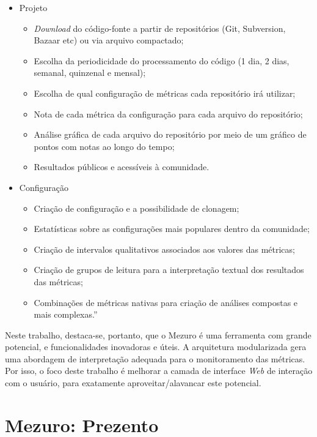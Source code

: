 \begin{itemize}
  \item Projeto
    \begin{itemize}
    \item \textit{Download} do código-fonte a partir de repositórios (Git,
    Subversion, Bazaar etc) ou via arquivo compactado;
        \item Escolha da periodicidade do processamento do código (1 dia, 2 dias,
        semanal, quinzenal e mensal);
        \item Escolha de qual configuração de métricas cada repositório irá
        utilizar;
        \item Nota de cada métrica da configuração para cada arquivo do
        repositório;
        \item Análise gráfica de cada arquivo do repositório por meio de um
        gráfico de pontos com notas ao longo do tempo;
        \item Resultados públicos e acessíveis à comunidade.
    \end{itemize}
    \item Configuração
    \begin{itemize}
    \item Criação de configuração e a possibilidade de clonagem;
        \item Estatísticas sobre as configurações mais populares dentro da
        comunidade;
        \item Criação de intervalos qualitativos associados aos valores das
        métricas;
        \item Criação de grupos de leitura para a interpretação textual dos
        resultados das métricas;
        \item Combinações de métricas nativas para criação de análises compostas
        e mais complexas.''
    \end{itemize}
\end{itemize}

Neste trabalho, destaca-se, portanto, que o Mezuro é uma ferramenta
com grande potencial, e funcionalidades inovadoras e úteis. A arquitetura
modularizada gera uma abordagem de interpretação adequada para o monitoramento
das métricas. Por isso, o foco deste trabalho é melhorar a camada de interface
\textit{Web} de interação com o usuário, para exatamente aproveitar/alavancar
este potencial.

\section{Mezuro: Prezento}

